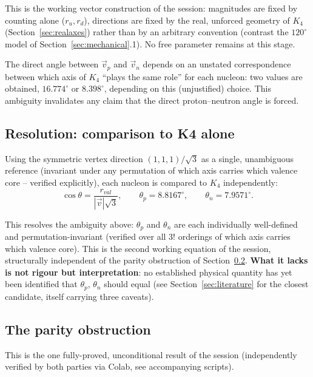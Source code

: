 \documentclass[11pt]{article}
\def\texorpdfstring#1#2{#2}%
\begin{document}
\begin{resultbox}
This is the working vector construction of the session: magnitudes are fixed by counting alone ($r_u,r_d$), directions are fixed by the real, unforced geometry of $K_4$ (Section~\ref{sec:realaxes}) rather than by an arbitrary convention (contrast the $120^\circ$ model of Section~\ref{sec:mechanical}.1). No free parameter remains at this stage.
\end{resultbox}

\begin{negativebox}
The direct angle between $\vec v_p$ and $\vec v_n$ depends on an unstated correspondence between which axis of $K_4$ ``plays the same role'' for each nucleon: two values are obtained, $16.774^\circ$ or $8.398^\circ$, depending on this (unjustified) choice. This ambiguity invalidates any claim that the direct proton--neutron angle is forced.
\end{negativebox}

\subsection{Resolution: comparison to \texorpdfstring{$K_4$}{K4} alone}
Using the symmetric vertex direction $(1,1,1)/\sqrt3$ as a single, unambiguous reference (invariant under any permutation of which axis carries which valence core -- verified explicitly), each nucleon is compared to $K_4$ independently:
\begin{equation}
\cos\theta = \frac{r_{val}}{|\vec v|\sqrt3}, \qquad \theta_p = 8.8167^\circ, \qquad \theta_n = 7.9571^\circ.
\end{equation}

\begin{resultbox}
This resolves the ambiguity above: $\theta_p$ and $\theta_n$ are each individually well-defined and permutation-invariant (verified over all $3!$ orderings of which axis carries which valence core). This is the second working equation of the session, structurally independent of the parity obstruction of Section~\ref{sec:obstruction}. \textbf{What it lacks is not rigour but interpretation}: no established physical quantity has yet been identified that $\theta_p$, $\theta_n$ should equal (see Section~\ref{sec:literature} for the closest candidate, itself carrying three caveats).
\end{resultbox}

\subsection{The parity obstruction}
\label{sec:obstruction}
This is the one fully-proved, unconditional result of the session (independently verified by both parties via Colab, see accompanying scripts).
\end{document}
